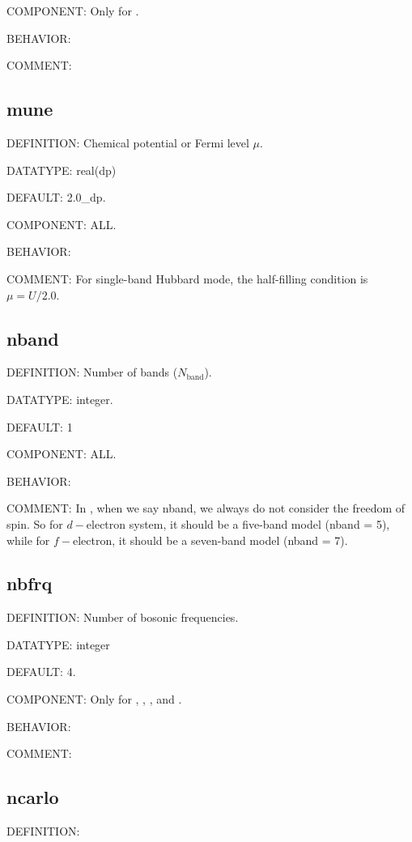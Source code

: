 {\color{brown}COMPONENT:} Only for {\daisy}.

{\color{purple}BEHAVIOR:}

{\color{olive}COMMENT:}

\subsection{mune}
{\color{red}DEFINITION:} Chemical potential or Fermi level $\mu$.

{\color{green}DATATYPE:} real(dp)

{\color{blue}DEFAULT:} 2.0\_dp.

{\color{brown}COMPONENT:} ALL.

{\color{purple}BEHAVIOR:}

{\color{olive}COMMENT:} For single-band Hubbard mode, the half-filling condition is $\mu = U/2.0$.

\subsection{nband}
{\color{red}DEFINITION:} Number of bands ($N_{\text{band}}$).

{\color{green}DATATYPE:} integer.

{\color{blue}DEFAULT:} 1

{\color{brown}COMPONENT:} ALL.

{\color{purple}BEHAVIOR:}

{\color{olive}COMMENT:} In {\iqist}, when we say nband, we always do not consider the freedom of spin. So for $d-$electron system, it should be a five-band model (nband = 5), while for $f-$electron, it should be a seven-band model (nband = 7).

\subsection{nbfrq}
{\color{red}DEFINITION:} Number of bosonic frequencies.

{\color{green}DATATYPE:} integer

{\color{blue}DEFAULT:} 4.

{\color{brown}COMPONENT:} Only for {\gardenia}, {\narcissus}, {\lavender}, and {\manjushaka}.

{\color{purple}BEHAVIOR:}

{\color{olive}COMMENT:}

\subsection{ncarlo}
{\color{red}DEFINITION:}

